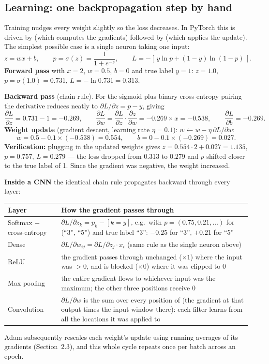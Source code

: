 \documentclass[11pt, a4paper]{article}
\newcommand{\code}[1]{\texttt{\detokenize{#1}}}
\begin{document}
\subsection{Learning: one backpropagation step by hand}
Training nudges every weight slightly so the loss decreases. In PyTorch this is driven by
\code{loss.backward()} (which computes the gradients) followed by \code{optimizer.step()} (which applies the update).
The simplest possible case is a single neuron taking one input:
\[
z = w x + b, \qquad p = \sigma(z) = \frac{1}{1+e^{-z}}, \qquad L = -[\,y\ln p + (1-y)\ln(1-p)\,].
\]
\textbf{Forward pass} with $x = 2$, $w = 0.5$, $b = 0$ and true label $y = 1$:
$z = 1.0$, $p = \sigma(1.0) = 0.731$, $L = -\ln 0.731 = 0.313$.

\textbf{Backward pass} (chain rule). For the sigmoid plus binary cross-entropy pairing the derivative reduces neatly to
$\partial L/\partial z = p - y$, giving
\[
\frac{\partial L}{\partial z} = 0.731 - 1 = -0.269, \qquad
\frac{\partial L}{\partial w} = \frac{\partial L}{\partial z}\cdot\frac{\partial z}{\partial w} = -0.269 \times x = -0.538, \qquad
\frac{\partial L}{\partial b} = -0.269 .
\]
\textbf{Weight update} (gradient descent, learning rate $\eta = 0.1$): $w \leftarrow w - \eta\,\partial L/\partial w$:
\[
w = 0.5 - 0.1\times(-0.538) = 0.554, \qquad b = 0 - 0.1\times(-0.269) = 0.027 .
\]
\textbf{Verification:} plugging in the updated weights gives $z = 0.554\cdot2 + 0.027 = 1.135$, $p = 0.757$,
$L = 0.279$ — the loss dropped from 0.313 to 0.279 and $p$ shifted closer to the true label of 1. Since the gradient
was negative, the weight increased.

\textbf{Inside a CNN} the identical chain rule propagates backward through every layer:
\begin{table}[H]
\centering
\small
\begin{tabular}{p{3cm}p{11.5cm}}
\toprule
Layer & How the gradient passes through \\
\midrule
Softmax + cross-entropy & $\partial L/\partial z_k = p_k - [k = y]$, e.g.\ with $p = (0.75, 0.21, \dots)$ for (``3'', ``5'')
  and true label ``3'': $-0.25$ for ``3'', $+0.21$ for ``5'' \\
Dense & $\partial L/\partial w_{ij} = \partial L/\partial z_j \cdot x_i$ (same rule as the single neuron above) \\
ReLU & the gradient passes through unchanged ($\times 1$) where the input was $> 0$, and is blocked ($\times 0$) where
  it was clipped to 0 \\
Max pooling & the entire gradient flows to whichever input was the maximum; the other three positions receive 0 \\
Convolution & $\partial L/\partial w$ is the sum over every position of (the gradient at that output times the input
  window there): each filter learns from all the locations it was applied to \\
\bottomrule
\end{tabular}
\end{table}
Adam subsequently rescales each weight's update using running averages of its gradients (Section~2.3), and this whole
cycle repeats once per batch across an epoch.
\end{document}
